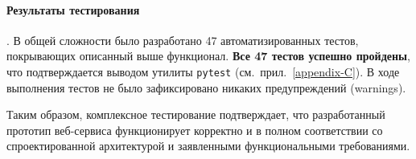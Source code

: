 \paragraph{Результаты тестирования}. В общей сложности было разработано 47 автоматизированных тестов,
покрывающих описанный выше функционал. \textbf{Все 47 тестов успешно пройдены}, что подтверждается
выводом утилиты \verb|pytest| (см.~прил.~\ref{appendix-C}). В ходе выполнения тестов не было
зафиксировано никаких предупреждений (warnings).

Таким образом, комплексное тестирование подтверждает, что разработанный прототип веб-сервиса
функционирует корректно и в полном соответствии со спроектированной архитектурой и заявленными
функциональными требованиями.